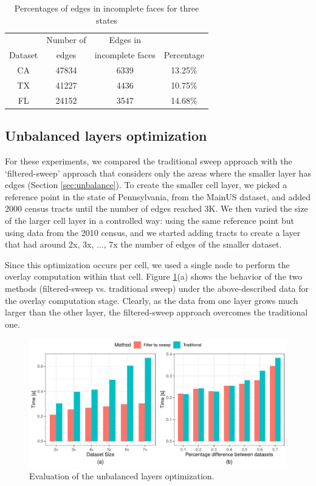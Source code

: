 \begin{table}
    \centering
    \caption{Percentages of edges in incomplete faces for three states} \label{tab:percentages}
    \begin{tabular}{cccc}
        \toprule
                & Number of & Edges in         &            \\
        Dataset & edges     & incomplete faces & Percentage \\
        \midrule
        CA &  47834 &  6339 & 13.25\% \\
        TX &  41227 &  4436 & 10.75\%\\
        FL &  24152 &  3547 & 14.68\%\\
        \bottomrule
    \end{tabular}
\end{table}

\subsection{Unbalanced layers optimization}
For these experiments, we compared the traditional sweep approach with the `filtered-sweep' approach that considers only the areas where the smaller layer has edges (Section \ref{sec:unbalance}).  To create the smaller cell layer, we picked a reference point in the state of Pennsylvania, from the MainUS dataset, and added 2000 census tracts until the number of edges reached 3K. We then varied the size of the larger cell layer in a controlled way: using the same reference point but using data from the 2010 census, and we started adding tracts to create a layer that had around 2x, 3x, ..., 7x the number of edges of the smaller dataset.

Since this optimization occurs per cell, we used a single node to perform the overlay computation within that cell. Figure \ref{fig:unbalance_tests}(a) shows the behavior of the two methods (filtered-sweep vs. traditional sweep) under the above-described data for the overlay computation stage.  Clearly, as the data from one layer grows much larger than the other layer, the filtered-sweep approach overcomes the traditional one.

\begin{figure}
    \centering
    \includegraphics[width=\linewidth]{chapterSDCEL/UnbalanceTester/Unbalance_Tester}
    \caption{Evaluation of the unbalanced layers optimization.}\label{fig:unbalance_tests}
\end{figure}


